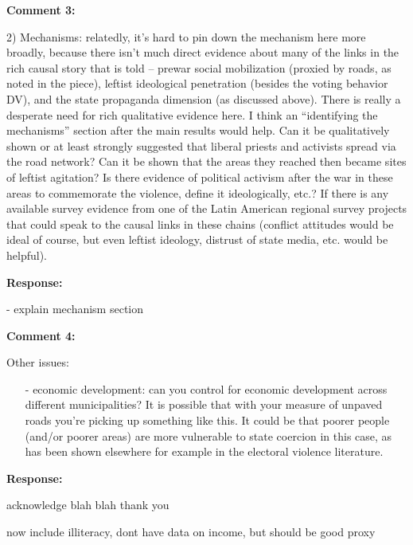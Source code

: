 \documentclass[12pt, a4paper, notitlepage]{article}
\begin{document}
\vspace{15pt}
\noindent\textbf{Comment 3:}
\begin{displayquote}
2) Mechanisms: relatedly, it’s hard to pin down the mechanism here more broadly, because there isn’t much direct evidence about many of the links in the rich causal story that is told – prewar social mobilization (proxied by roads, as noted in the piece), leftist ideological penetration (besides the voting behavior DV), and the state propaganda dimension (as discussed above). There is really a desperate need for rich qualitative evidence here. I think an “identifying the mechanisms” section after the main results would help. Can it be qualitatively shown or at least strongly suggested that liberal priests and activists spread via the road network? Can it be shown that the areas they reached then became sites of leftist agitation? Is there evidence of political activism after the war in these areas to commemorate the violence, define it ideologically, etc.? If there is any available survey evidence from one of the Latin American regional survey projects that could speak to the causal links in these chains (conflict attitudes would be ideal of course, but even leftist ideology, distrust of state media, etc. would be helpful).
\end{displayquote}

\noindent\textbf{Response:}  {}

- explain mechanism section

\vspace{15pt}
\noindent\textbf{Comment 4:}
\begin{displayquote}
Other issues:

\begin{itemize}
\item[-] economic development: can you control for economic development across different municipalities? It is possible that with your measure of unpaved roads you’re picking up something like this. It could be that poorer people (and/or poorer areas) are more vulnerable to state coercion in this case, as has been shown elsewhere for example in the electoral violence literature.
\end{itemize}
\end{displayquote}

\noindent\textbf{Response:} {}

acknowledge blah blah thank you

now include illiteracy, dont have data on income, but should be good proxy
\end{document}
